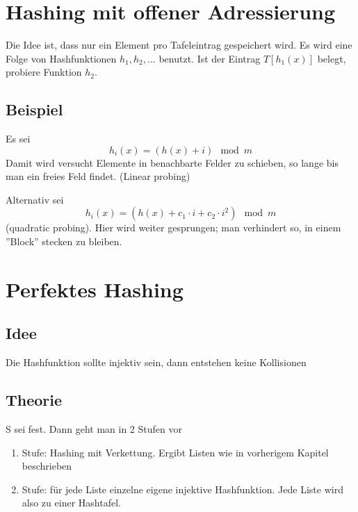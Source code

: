                     
        
    \section{Hashing mit offener Adressierung}
    \label{sec:offeneAdressierung}
        Die Idee ist, dass nur ein Element pro Tafeleintrag gespeichert wird.
        Es wird eine Folge von Hashfunktionen $h_1, h_2, ...$ benutzt. Ist der Eintrag $T[h_1(x)]$ belegt, probiere Funktion $h_2$.
        
        \subsection{Beispiel}
            Es sei 
            $$
                h_i(x) = (h(x) + i) \mod m
            $$ 
            Damit wird versucht Elemente in benachbarte Felder zu schieben, so lange bis man ein freies Feld findet. (Linear probing)
            
            Alternativ sei
            $$
                h_i(x) = (h(x) + c_1\cdot i + c_2 \cdot i^2) \mod m
            $$
            (quadratic probing). Hier wird weiter gesprungen; man verhindert so, in einem ''Block'' stecken zu bleiben.
            
            
    \section{Perfektes Hashing}
        \subsection{Idee}
            Die Hashfunktion sollte injektiv sein, dann entstehen keine Kollisionen
            
        \subsection{Theorie}
            S sei fest. Dann geht man in 2 Stufen vor
            \begin{enumerate}
                \item Stufe: Hashing mit Verkettung. Ergibt Listen wie in vorherigem Kapitel beschrieben
                \item Stufe: für jede Liste einzelne eigene injektive Hashfunktion. Jede Liste wird also zu einer Hashtafel.
            \end{enumerate}
            
